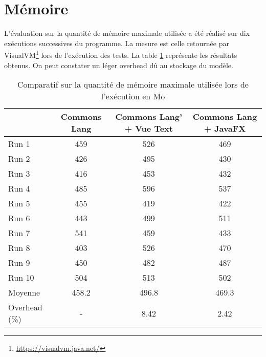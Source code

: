 \section{Mémoire}
\label{memoire}

L'évaluation sur la quantité de mémoire maximale utilisée a été réalisé sur dix exécutions successives du programme. La mesure est celle retournée par VisualVM\footnote{\url{https://visualvm.java.net/}} lors de l'exécution des tests. La table \ref{evaluation_memoire} représente les résultats obtenus. On peut constater un léger overhead dû au stockage du modèle.

\begin{table}[H]
\centering
\begin{tabular}{|l|c|c|c|}
\hline
         & Commons Lang & Commons Lang' + Vue Text & Commons Lang + JavaFX\\
         \hline
Run 1     & 459  & 526       & 469        \\
Run 2     & 426  & 495       & 430        \\
Run 3     & 416  & 453       & 432        \\
Run 4     & 485  & 596       & 537        \\
Run 5     & 455  & 419       & 422        \\
Run 6     & 443  & 499       & 511        \\
Run 7     & 541  & 459       & 433        \\
Run 8     & 403  & 526       & 470        \\
Run 9     & 450  & 482       & 487        \\
Run 10    & 504  & 513       & 502        \\
\hline
Moyenne  & 458.2  & 496.8       & 469.3        \\
\hline
Overhead (\%) & -  & 8.42       & 2.42   \\
\hline    
\end{tabular}
\caption{Comparatif sur la quantité de mémoire maximale utilisée lors de l'exécution en Mo}
\label{evaluation_memoire}
\end{table}
